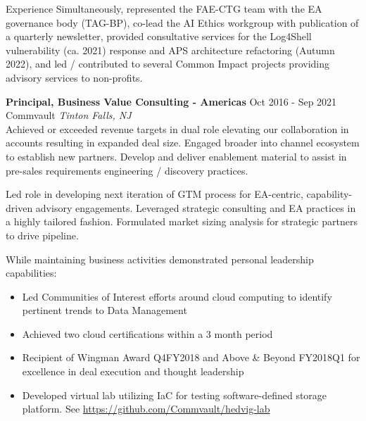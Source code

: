 \documentclass{resume} %
\begin{document}
\begin{rSection}{Experience}
Simultaneously, represented the FAE-CTG team with the EA governance body (TAG-BP), co-lead the AI Ethics workgroup with publication of a quarterly newsletter, provided consultative services for the Log4Shell vulnerability (ca. 2021) response and APS architecture refactoring (Autumn 2022), and led / contributed to several Common Impact projects providing advisory services to non-profits. 
 
\textbf{Principal, Business Value Consulting - Americas} \hfill Oct 2016 - Sep 2021\\
Commvault \hfill \textit{Tinton Falls, NJ}\\
Achieved or exceeded revenue targets in dual role elevating our collaboration in accounts resulting in expanded deal size. Engaged broader into channel ecosystem to establish new partners. Develop and deliver enablement material to assist in pre-sales requirements engineering / discovery practices.

Led role in developing next iteration of GTM process for EA-centric, capability-driven advisory engagements. Leveraged strategic consulting and EA practices in a highly tailored fashion. Formulated market sizing analysis for strategic partners to drive pipeline.

While maintaining business activities demonstrated personal leadership capabilities:
\begin{itemize}
  \itemsep -3pt {} 
  \item Led Communities of Interest efforts around cloud computing to identify pertinent trends to Data Management
  \item Achieved two cloud certifications within a 3 month period
  \item Recipient of Wingman Award Q4FY2018 and Above \& Beyond FY2018Q1 for excellence in deal execution and thought leadership
  \item Developed virtual lab utilizing IaC for testing software-defined storage platform. See \url{https://github.com/Commvault/hedvig-lab}
\end{itemize}


\end{rSection}
\end{document}
